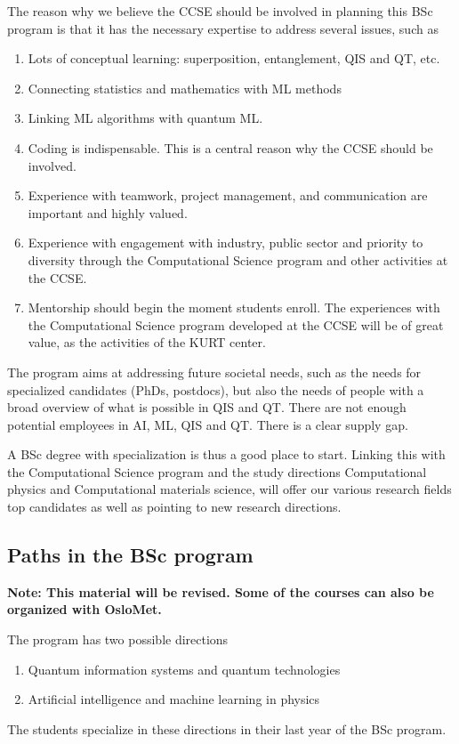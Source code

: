 \documentclass[aps,rmp,preprint,amsmath,amssymb,graphicx,longbibliography]{revtex4-1}
\begin{document}
The reason why we believe the CCSE should be involved in planning this BSc program is that it has the necessary expertise to address several issues, such as
\begin{enumerate}
    \item  Lots of conceptual learning: superposition, entanglement, QIS and QT, etc. 
    \item Connecting statistics and mathematics with ML methods
    \item Linking ML algorithms with quantum ML.
\item Coding is indispensable. This is a central reason why the CCSE should be involved.
\item Experience with teamwork, project management, and communication are important and highly valued.
\item  Experience with engagement with industry, public sector and priority to diversity through the Computational Science program and other activities at the CCSE.
\item  Mentorship should begin the moment students enroll. The experiences with the Computational Science program developed at the CCSE will be of great value, as the activities of the KURT center.
\end{enumerate}

The program aims at addressing future societal needs, such as the  needs for specialized candidates (PhDs, postdocs), but also the needs of  people with a broad overview of what is possible in  QIS and QT. There are  not enough potential employees in AI, ML, QIS and QT. There is  a clear supply gap.

A BSc degree  with specialization  is thus a good place to start. Linking this with the Computational Science program and the study directions Computational physics and Computational materials science, will offer our various research fields top candidates as well as pointing to new research directions. 

\subsection{Paths in the BSc program}
{\bf Note: This material will be revised. Some of the courses can also be organized with OsloMet.}


The program has two possible directions
\begin{enumerate}
    \item Quantum information systems and quantum technologies
    \item Artificial intelligence and machine learning in physics
\end{enumerate}
The students specialize in these directions in their last year of the BSc program.
\end{document}

